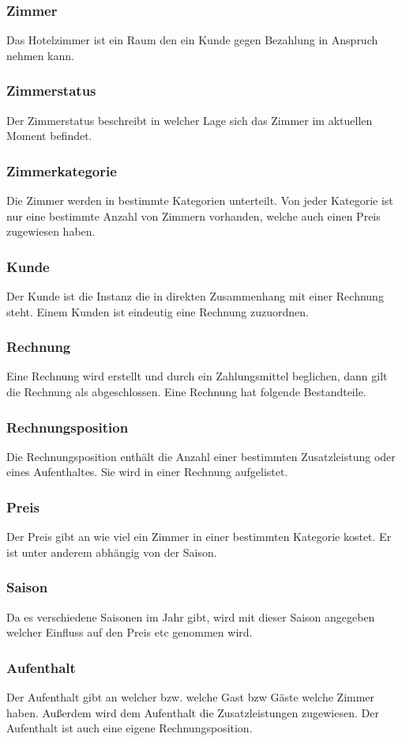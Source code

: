 \documentclass[10pt,a4paper,titlepage]{article}
\begin{document}
\subsubsection{Zimmer}
Das Hotelzimmer ist ein Raum den ein Kunde gegen Bezahlung in Anspruch nehmen kann.
\subsubsection{Zimmerstatus}
Der Zimmerstatus beschreibt in welcher Lage sich das Zimmer im aktuellen Moment befindet.
\subsubsection{Zimmerkategorie}
Die Zimmer werden in bestimmte Kategorien unterteilt. Von jeder Kategorie ist
nur eine bestimmte Anzahl von Zimmern vorhanden, welche auch einen Preis
zugewiesen haben.
\subsubsection{Kunde}
Der Kunde ist die Instanz die in direkten Zusammenhang mit einer Rechnung steht.
Einem Kunden ist eindeutig eine Rechnung zuzuordnen.
\subsubsection{Rechnung}
Eine Rechnung wird erstellt und durch ein Zahlungsmittel beglichen, dann gilt die Rechnung als abgeschlossen. Eine Rechnung hat folgende Bestandteile.
\subsubsection{Rechnungsposition}
Die Rechnungsposition enthält die Anzahl einer bestimmten Zusatzleistung oder
eines Aufenthaltes. Sie wird in einer Rechnung aufgelistet.
\subsubsection{Preis}
Der Preis gibt an wie viel ein Zimmer in einer bestimmten Kategorie kostet. Er
ist unter anderem abhängig von der Saison.
\subsubsection{Saison}
Da es verschiedene Saisonen im Jahr gibt, wird mit dieser Saison angegeben
welcher Einfluss auf den Preis etc genommen wird. 
\subsubsection{Aufenthalt}
Der Aufenthalt gibt an welcher bzw. welche Gast bzw Gäste welche Zimmer haben.
Außerdem wird dem Aufenthalt die Zusatzleistungen zugewiesen. Der Aufenthalt ist
auch eine eigene Rechnungsposition.
\end{document}
